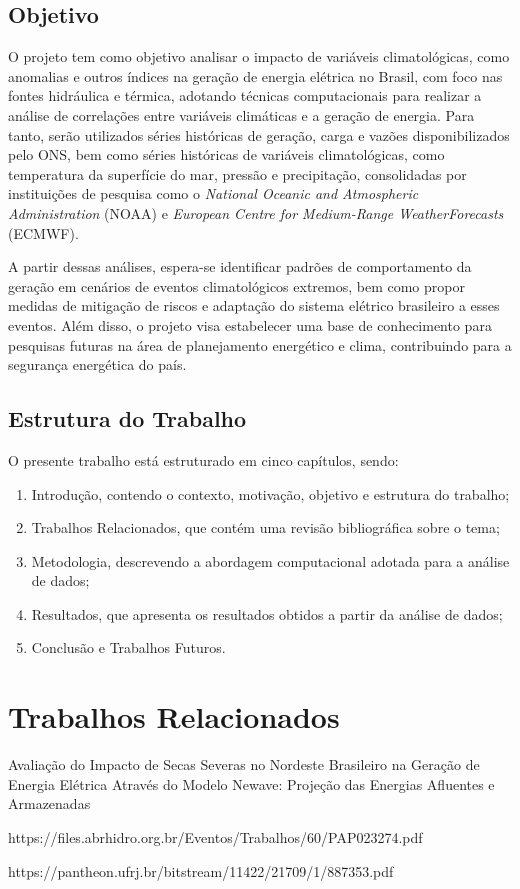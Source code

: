 \section{Objetivo}
O projeto tem como objetivo analisar o impacto de variáveis climatológicas, como anomalias e outros índices na geração 
de energia elétrica no Brasil, com foco nas fontes hidráulica e térmica, adotando técnicas computacionais para realizar 
a análise de correlações entre variáveis climáticas e a geração de energia. Para tanto, serão utilizados séries 
históricas de geração, carga e vazões disponibilizados pelo ONS, bem como séries históricas de variáveis climatológicas,
 como temperatura da superfície do mar, pressão e precipitação, consolidadas por instituições de pesquisa como o
 \textit{National Oceanic and Atmospheric Administration} (NOAA) e 
 \textit{European Centre for Medium-Range WeatherForecasts} (ECMWF).

A partir dessas análises, espera-se identificar padrões de comportamento da geração em cenários de eventos 
climatológicos extremos, bem como propor medidas de mitigação de riscos e adaptação do sistema elétrico brasileiro a 
esses eventos. Além disso, o projeto visa estabelecer uma base de conhecimento para pesquisas futuras na área de
planejamento energético e clima, contribuindo para a segurança energética do país.

\section{Estrutura do Trabalho}

O presente trabalho está estruturado em cinco capítulos, sendo:
\begin{enumerate}
	\item Introdução, contendo o contexto, motivação, objetivo e estrutura do trabalho;
	\item Trabalhos Relacionados, que contém uma revisão bibliográfica sobre o tema;
	\item Metodologia, descrevendo a abordagem computacional adotada para a análise de dados;
	\item Resultados, que apresenta os resultados obtidos a partir da análise de dados;
	\item Conclusão e Trabalhos Futuros.
\end{enumerate}

\chapter{Trabalhos Relacionados}
Avaliação do Impacto de Secas Severas no Nordeste Brasileiro na Geração de Energia Elétrica Através do Modelo Newave: 
Projeção das Energias Afluentes e Armazenadas \cite{Vilar2020}

{https://files.abrhidro.org.br/Eventos/Trabalhos/60/PAP023274.pdf}

{https://pantheon.ufrj.br/bitstream/11422/21709/1/887353.pdf}